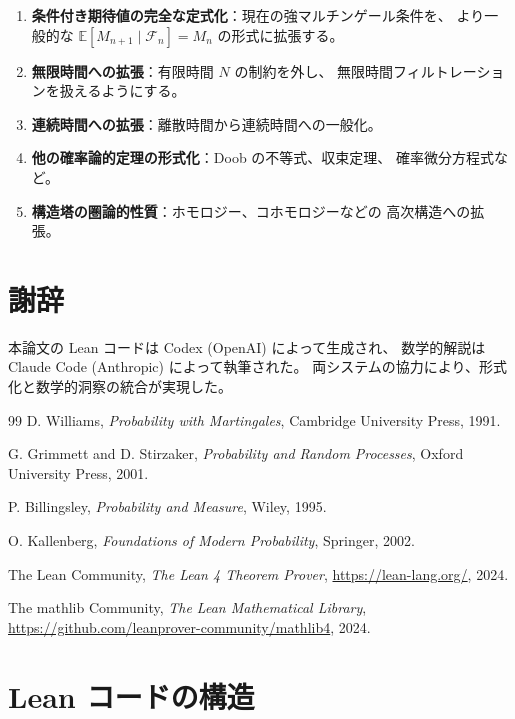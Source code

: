 \documentclass[a4paper,12pt]{ltjsarticle}
\theoremstyle{definition}
\begin{document}
\begin{enumerate}
\item \textbf{条件付き期待値の完全な定式化}：現在の強マルチンゲール条件を、
より一般的な $\mathbb{E}[M_{n+1} \mid \mathcal{F}_n] = M_n$ の形式に拡張する。

\item \textbf{無限時間への拡張}：有限時間 $N$ の制約を外し、
無限時間フィルトレーションを扱えるようにする。

\item \textbf{連続時間への拡張}：離散時間から連続時間への一般化。

\item \textbf{他の確率論的定理の形式化}：Doob の不等式、収束定理、
確率微分方程式など。

\item \textbf{構造塔の圏論的性質}：ホモロジー、コホモロジーなどの
高次構造への拡張。
\end{enumerate}

\section*{謝辞}

本論文の Lean コードは Codex (OpenAI) によって生成され、
数学的解説は Claude Code (Anthropic) によって執筆された。
両システムの協力により、形式化と数学的洞察の統合が実現した。

\begin{thebibliography}{99}
D. Williams,
\textit{Probability with Martingales},
Cambridge University Press, 1991.

G. Grimmett and D. Stirzaker,
\textit{Probability and Random Processes},
Oxford University Press, 2001.

P. Billingsley,
\textit{Probability and Measure},
Wiley, 1995.

O. Kallenberg,
\textit{Foundations of Modern Probability},
Springer, 2002.

The Lean Community,
\textit{The Lean 4 Theorem Prover},
\url{https://lean-lang.org/}, 2024.

The mathlib Community,
\textit{The Lean Mathematical Library},
\url{https://github.com/leanprover-community/mathlib4}, 2024.

\end{thebibliography}

\appendix

\section{Lean コードの構造}
\end{document}

